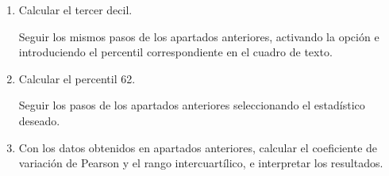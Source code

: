\begin{enumerate}[leftmargin=*]
\begin{enumerate}
\item  Calcular el tercer decil.
\begin{indicacion}
Seguir los mismos pasos de los apartados anteriores, activando la
opción  e introduciendo el percentil
correspondiente en el cuadro de texto.
\end{indicacion}

\item  Calcular el percentil 62.
\begin{indicacion}
Seguir los pasos de los apartados anteriores seleccionando el estadístico deseado.
\end{indicacion}

\item Con los datos obtenidos en apartados anteriores, calcular el
coeficiente de variación de Pearson y el rango intercuartílico, e
interpretar los resultados.
\end{enumerate}


\end{enumerate}
